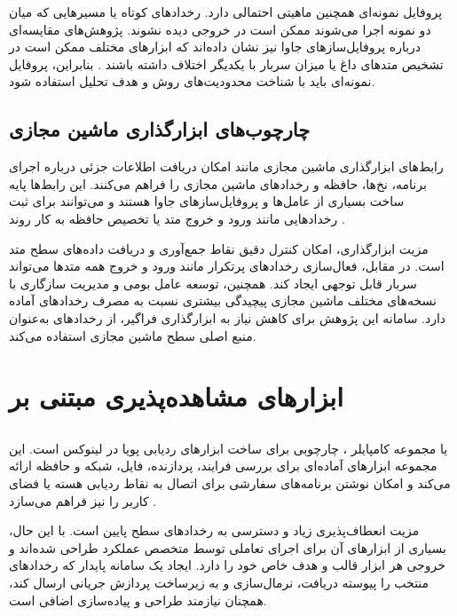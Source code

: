 پروفایل نمونه‌ای همچنین ماهیتی احتمالی دارد. رخدادهای کوتاه یا مسیرهایی
که میان دو نمونه اجرا می‌شوند ممکن است در خروجی دیده نشوند. پژوهش‌های
مقایسه‌ای درباره پروفایل‌سازهای جاوا نیز نشان داده‌اند که ابزارهای مختلف
ممکن است در تشخیص متدهای داغ یا میزان سربار با یکدیگر اختلاف داشته باشند
\cite{donttrustprofiler}. بنابراین، پروفایل نمونه‌ای باید با شناخت
محدودیت‌های روش و هدف تحلیل استفاده شود.

\subsection{چارچوب‌های ابزارگذاری ماشین مجازی}

رابط‌های ابزارگذاری ماشین مجازی مانند  امکان دریافت اطلاعات
جزئی درباره اجرای برنامه، نخ‌ها، حافظه و رخدادهای ماشین مجازی را فراهم
می‌کنند. این رابط‌ها پایه ساخت بسیاری از عامل‌ها و پروفایل‌سازهای جاوا
هستند و می‌توانند برای ثبت رخدادهایی مانند ورود و خروج متد یا تخصیص حافظه
به کار روند \cite{jvmtipaper}.

مزیت ابزارگذاری، امکان کنترل دقیق نقاط جمع‌آوری و دریافت داده‌های سطح
متد است. در مقابل، فعال‌سازی رخدادهای پرتکرار مانند ورود و خروج همه متدها
می‌تواند سربار قابل توجهی ایجاد کند. همچنین، توسعه عامل بومی و مدیریت
سازگاری با نسخه‌های مختلف ماشین مجازی پیچیدگی بیشتری نسبت به مصرف
رخدادهای آماده  دارد. سامانه این پژوهش برای کاهش نیاز به
ابزارگذاری فراگیر، از رخدادهای  به‌عنوان منبع اصلی سطح ماشین
مجازی استفاده می‌کند.

\section{ابزارهای مشاهده‌پذیری مبتنی بر }
\label{sec:related-ebpf-tools}

\subsection{}

 یا مجموعه کامپایلر ، چارچوبی برای ساخت ابزارهای ردیابی
پویا در لینوکس است. این مجموعه ابزارهای آماده‌ای برای بررسی فرایند،
پردازنده، فایل، شبکه و حافظه ارائه می‌کند و امکان نوشتن برنامه‌های سفارشی
برای اتصال به نقاط ردیابی هسته یا فضای کاربر را نیز فراهم می‌سازد
\cite{bccdocs,bccprimer}.

مزیت  انعطاف‌پذیری زیاد و دسترسی به رخدادهای سطح پایین است. با
این حال، بسیاری از ابزارهای آن برای اجرای تعاملی توسط متخصص عملکرد طراحی
شده‌اند و خروجی هر ابزار قالب و هدف خاص خود را دارد. ایجاد یک سامانه
پایدار که رخدادهای منتخب را پیوسته دریافت، نرمال‌سازی و به زیرساخت
پردازش جریانی ارسال کند، همچنان نیازمند طراحی و پیاده‌سازی اضافی است.

